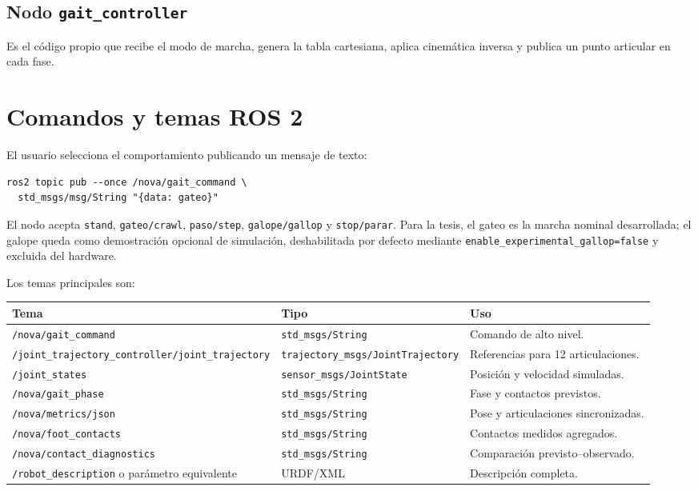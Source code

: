 \documentclass[11pt,a4paper]{article}
\begin{document}
\subsection{Nodo \texttt{gait\_controller}}
Es el código propio que recibe el modo de marcha, genera la tabla cartesiana,
aplica cinemática inversa y publica un punto articular en cada fase.

\section{Comandos y temas ROS 2}
El usuario selecciona el comportamiento publicando un mensaje de texto:
\begin{lstlisting}[style=terminal]
ros2 topic pub --once /nova/gait_command \
  std_msgs/msg/String "{data: gateo}"
\end{lstlisting}
El nodo acepta \texttt{stand}, \texttt{gateo/crawl}, \texttt{paso/step},
\texttt{galope/gallop} y \texttt{stop/parar}. Para la tesis, el gateo es la
marcha nominal desarrollada; el galope queda como demostración opcional de
simulación, deshabilitada por defecto mediante
\texttt{enable\_experimental\_gallop=false} y excluida del hardware.

Los temas principales son:
\begin{table}[h]
\centering
\small
\begin{tabular}{p{}p{}p{}}
\toprule
Tema & Tipo & Uso\\
\midrule
\texttt{/nova/gait\_command} & \texttt{std\_msgs/String} & Comando de alto nivel.\\
\texttt{/joint\_trajectory\_controller/joint\_trajectory} &
\texttt{trajectory\_msgs/JointTrajectory} & Referencias para 12 articulaciones.\\
\texttt{/joint\_states} & \texttt{sensor\_msgs/JointState} & Posición y velocidad simuladas.\\
\texttt{/nova/gait\_phase} & \texttt{std\_msgs/String} & Fase y contactos previstos.\\
\texttt{/nova/metrics/json} & \texttt{std\_msgs/String} & Pose y articulaciones sincronizadas.\\
\texttt{/nova/foot\_contacts} & \texttt{std\_msgs/String} & Contactos medidos agregados.\\
\texttt{/nova/contact\_diagnostics} & \texttt{std\_msgs/String} & Comparación previsto--observado.\\
\texttt{/robot\_description} o parámetro equivalente & URDF/XML & Descripción completa.\\
\bottomrule
\end{tabular}
\end{table}
\end{document}
